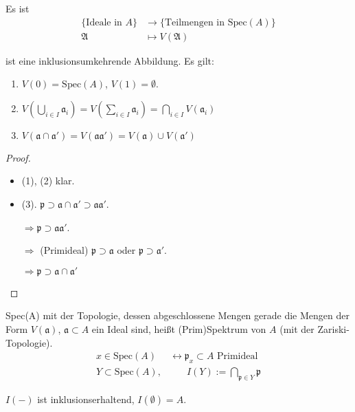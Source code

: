 \begin{lem}[1] Es ist
  \begin{align*}
    \{\text{Ideale in }A\} & \longrightarrow\text{\{Teilmengen in Spec}(A)\}\\
    \mathfrak{A} & \longmapsto V(\mathfrak{A})
  \end{align*}

  ist eine inklusionsumkehrende Abbildung. Es gilt:
  \begin{enumerate}
  \item $V(0)=\text{Spec}(A)$, $V(1)=\emptyset$.
  \item $V\left(\bigcup_{i\in
        I}\mathfrak{a}_{i}\right)=V\left(\sum_{i\in
        I}\mathfrak{a}_{i}\right)=\bigcap_{i\in I}V(\mathfrak{a}_{i})$
  \item
    $V(\mathfrak{a}\cap\mathfrak{a}')=V(\mathfrak{a}\mathfrak{a}')=V(\mathfrak{a})\cup
    V(\mathfrak{a}')$
  \end{enumerate}
\end{lem}
\begin{proof} \mbox{}
  \begin{itemize}
  \item (1), (2) klar.
  \item
    (3). $\mathfrak{p}\supset\mathfrak{a}\cap\mathfrak{a}'\supset\mathfrak{a}\mathfrak{a}'$.

    $\Rightarrow\mathfrak{p}\supset\mathfrak{a}\mathfrak{a}'$.

    $\Rightarrow$ (Primideal) $\mathfrak{p}\supset\mathfrak{a}$ oder
    $\mathfrak{p}\supset\mathfrak{a}'$.

    $\Rightarrow\mathfrak{p}\supset\mathfrak{a}\cap\mathfrak{a}'$

  \end{itemize}
\end{proof}
\begin{defn} Spec(A) mit der Topologie, dessen abgeschlossene Mengen
  gerade die Mengen der Form $V(\mathfrak{a})$,
  $\mathfrak{a}\subset A$ ein Ideal sind, heißt (Prim)Spektrum von $A$
  (mit der Zariski-Topologie).
  \begin{align*}
    x\in\text{Spec}(A) & \leftrightarrow\mathfrak{p}_{x}\subset A\text{ Primideal}\\
    Y\subset\text{Spec}(A), & \phantom{\leftrightarrow\
                              }I(Y):=\bigcap_{\mathfrak{p}\in Y}\mathfrak{p}
  \end{align*}

  $I(-)$ ist inklusionserhaltend, $I(\emptyset)=A$.
\end{defn}
